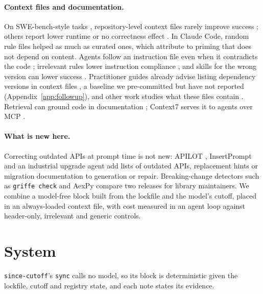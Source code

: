\documentclass[11pt]{article}
\newcommand{\tool}{\texttt{since-cutoff}\xspace}
\newcommand{\code}[1]{\texttt{#1}}
\begin{document}
\paragraph{Context files and documentation.}
On SWE-bench-style tasks \citep{jimenez2024swebench}, repository-level context files rarely improve success \citep{gloaguen2026agentsmd}; others report lower runtime \citep{lulla2026agentsmdefficiency} or no correctness effect \citep{khatri2026contextfiles}.
In Claude Code, random rule files helped as much as curated ones, which \citet{zhang2026guardrails} attribute to priming that does not depend on content.
Agents follow an instruction file even when it contradicts the code \citep{xu2026staleinstructions}; irrelevant rules lower instruction compliance \citep{liu2026alwaysloaded}, and skills for the wrong version can lower success \citep{han2026sweskills}.
Practitioner guides already advise listing dependency versions in context files \citep{nigh2025agentsmd}, a baseline we pre-committed but have not reported (Appendix~\ref{app:followup}), and other work studies what these files contain \citep{chatlatanagulchai2025agentreadmes,polandra2026agenticinstruction}.
Retrieval can ground code in documentation \citep{majdoub2026libraryissues,leanh2026crosscoder,chen2025apidocsrag,jain2024dag}; Context7 serves it to agents over MCP \citep{context7,mcpspec}.

\paragraph{What is new here.}
Correcting outdated APIs at prompt time is not new: APILOT \citep{bai2025apilot}, InsertPrompt \citep{wang2025llmslibraryevolution} and an industrial upgrade agent \citep{tawosi2025depupgrade} add lists of outdated APIs, replacement hints or migration documentation to generation or repair.
Breaking-change detectors such as \code{griffe check} \citep{griffe} and AexPy \citep{du2022aexpy} compare two releases for library maintainers.
We combine a model-free block built from the lockfile and the model's cutoff, placed in an always-loaded context file, with cost measured in an agent loop against header-only, irrelevant and generic controls.

\section{System}
\label{sec:system}

\tool's \code{sync} calls no model, so its block is deterministic given the lockfile, cutoff and registry state, and each note states its evidence.
\end{document}
